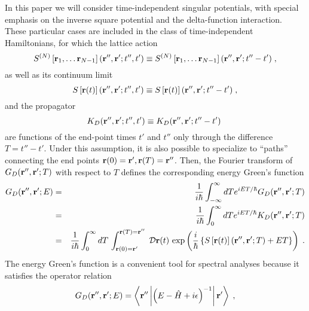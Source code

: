 \documentclass[a4paper,preprint,draft,showpacs,amsmath,amsfonts,amssymb,aps,prd]{revtex4}%
\begin{document}
In this paper we
 will consider time-independent singular potentials,
with special emphasis on the inverse square potential and the delta-function
interaction.
These particular cases
are included in the class of time-independent
Hamiltonians, for which the lattice action
\begin{equation}
S^{(N)}  
 \left[ 
{\bf r}_{1},
\dots
{\bf r}_{N-1}
\right]  ({\bf r}'', {\bf r}' ; t'',t')  
 \equiv 
S^{(N)}  
 \left[ 
{\bf r}_{1},
\dots
{\bf r}_{N-1}
\right]  ({\bf r}'', {\bf r}' ; t''-t')  
\; ,
\end{equation}
as well as its continuum limit
\begin{equation}
S \left[ {\bf r}(t)  \right]  ({\bf r}'', {\bf r}' ; t'',t')  
 \equiv 
S \left[ {\bf r}(t)  \right]  ({\bf r}'', {\bf r}' ; t''-t')  
\;  ,
\end{equation}
and the propagator
\begin{equation}
 K_{D}  ( {\bf r}'', {\bf r}' ; t'',t' )  
 \equiv  
K_{D}  ( {\bf r}'', {\bf r}' ; t''-t')  
\;
\end{equation}
are functions of the end-point times
$t'$ and $t''$
only through the difference $T=t''-t'$.
Under this assumption, it
is also possible to specialize to ``paths'' 
connecting the end points
${\bf r} (0)  = {\bf r}',  {\bf r} (T)  = {\bf r}'' $.
Then, the Fourier transform of $G_{D} ({\bf r}'', {\bf r}' ; T) $
with respect to $T$ defines
the corresponding energy Green's function
\begin{eqnarray}
G_{D} ({\bf r}'', {\bf r}' ; E) 
& = &
\frac{1}{ i\hbar }
\int_{-\infty}^{\infty} dT  
e^{iET/\hbar}
G_{D}({\bf r}'', {\bf r}' ; T)  
\nonumber \\
& = &
\frac{1}{ i\hbar }
\int_{0}^{\infty} dT  
e^{iET/\hbar}
K_{D}({\bf r}'', {\bf r}' ; T)  
\label{eq:GreenF_def}
 \\
& = &
\frac{1}{ i\hbar }
\int_{0}^{\infty} dT  
\,
\int_{  {\bf r} (0)  = {\bf r}'  }^{  {\bf r} (T)  = {\bf r}'' }
 \;  
{\cal D} {\bf r} (t) \,
\exp 
\left(
\frac{i}{\hbar} 
\left\{ 
S \left[ {\bf r}(t)  \right]  ({\bf r}'', {\bf r}' ; T)  +
ET 
\right\}
\right)
\; .
\label{eq:GreenF_def_from_PIs}
\end{eqnarray}
The energy Green's function
is a convenient tool for spectral analyses
because it satisfies the
operator relation
\begin{equation}
G_{D} ({\bf r}'', {\bf r}' ; E) 
=
\left\langle 
{\bf r}'' 
\left|
\left( 
E - \hat{H} + i \epsilon 
\right)^{-1}
 \right|
{\bf r}'
 \right\rangle   
\; ,
\label{eq:GreenF_operator_def}
\end{equation}
\end{document}
